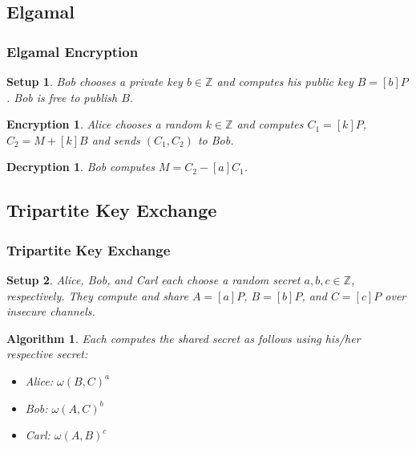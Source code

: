 \documentclass{beamer}
\newtheorem{algorithm}{Algorithm}
\newtheorem{setup}{Setup}
\newtheorem{encryption}{Encryption}
\newtheorem{decryption}{Decryption}
\begin{document}
    \subsection{Elgamal}
    \begin{frame}
        \frametitle{Elgamal Encryption}
        \begin{setup}
            Bob chooses a private key \(b \in \mathbb{Z}\) and computes
            his public key \(B = [b]P\). Bob is free to publish \(B\).
        \end{setup}
        \vfill
        \begin{encryption}
            Alice chooses a random \(k \in \mathbb{Z}\)
            and computes \(C_1 = [k]P\),
            \(C_2 = M + [k]B\) and sends \((C_1, C_2)\) to Bob.
        \end{encryption}
        \vfill
        \begin{decryption}
            Bob computes \(M = C_2 - [a]C_1\).
        \end{decryption}
    \end{frame}

    \subsection{Tripartite Key Exchange}
    \begin{frame}
        \frametitle{Tripartite Key Exchange}
        \begin{setup}
            Alice, Bob, and Carl each choose a random secret
            \(a, b, c \in \mathbb{Z}\), respectively. They compute and
            share \(A = [a]P\), \(B = [b]P\), and \(C = [c]P\)
            over insecure channels.
        \end{setup}
        \vfill
        \begin{algorithm}
            Each computes the shared secret as follows using his/her
            respective secret:
            \begin{itemize}
                \item Alice: \(\omega(B, C)^a\)
                \item Bob: \(\omega(A, C)^b\)
                \item Carl: \(\omega(A, B)^c\)
            \end{itemize}
        \end{algorithm}
    \end{frame}
\end{document}
